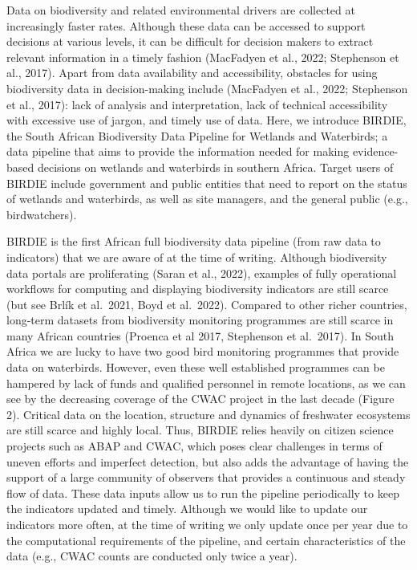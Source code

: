 \documentclass[utf8]{frontiersSCNS}
\begin{document}
Data on biodiversity and related environmental drivers are collected at
increasingly faster rates. Although these data can be accessed to
support decisions at various levels, it can be difficult for decision
makers to extract relevant information in a timely fashion (MacFadyen et
al., 2022; Stephenson et al., 2017). Apart from data availability and
accessibility, obstacles for using biodiversity data in decision-making
include (MacFadyen et al., 2022; Stephenson et al., 2017): lack of
analysis and interpretation, lack of technical accessibility with
excessive use of jargon, and timely use of data. Here, we introduce
BIRDIE, the South African Biodiversity Data Pipeline for Wetlands and
Waterbirds; a data pipeline that aims to provide the information needed
for making evidence-based decisions on wetlands and waterbirds in
southern Africa. Target users of BIRDIE include government and public
entities that need to report on the status of wetlands and waterbirds,
as well as site managers, and the general public (e.g., birdwatchers).

BIRDIE is the first African full biodiversity data pipeline (from raw
data to indicators) that we are aware of at the time of writing.
Although biodiversity data portals are proliferating (Saran et al.,
2022), examples of fully operational workflows for computing and
displaying biodiversity indicators are still scarce (but see Brlík et
al.~2021, Boyd et al.~2022). Compared to other richer countries,
long-term datasets from biodiversity monitoring programmes are still
scarce in many African countries (Proenca et al 2017, Stephenson et
al.~2017). In South Africa we are lucky to have two good bird monitoring
programmes that provide data on waterbirds. However, even these well
established programmes can be hampered by lack of funds and qualified
personnel in remote locations, as we can see by the decreasing coverage
of the CWAC project in the last decade (Figure 2). Critical data on the
location, structure and dynamics of freshwater ecosystems are still
scarce and highly local. Thus, BIRDIE relies heavily on citizen science
projects such as ABAP and CWAC, which poses clear challenges in terms of
uneven efforts and imperfect detection, but also adds the advantage of
having the support of a large community of observers that provides a
continuous and steady flow of data. These data inputs allow us to run
the pipeline periodically to keep the indicators updated and timely.
Although we would like to update our indicators more often, at the time
of writing we only update once per year due to the computational
requirements of the pipeline, and certain characteristics of the data
(e.g., CWAC counts are conducted only twice a year).
\end{document}

